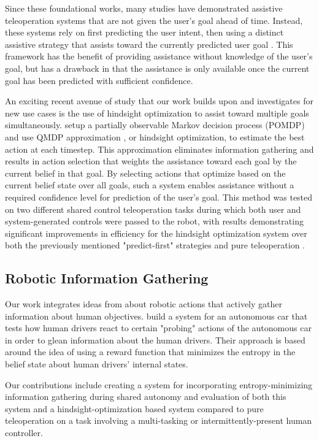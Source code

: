 \documentclass[conference]{IEEEtran}
\begin{document}
Since these foundational works, many studies have demonstrated assistive teleoperation systems that are not given the user's goal ahead of time. Instead, these systems rely on first predicting the user intent, then using a distinct assistive strategy that assists toward the currently predicted user goal \cite{dragan2012formalizing, fagg2004extracting, kragic2005human, schultz2017goal, yu2005telemanipulation}. This framework has the benefit of providing assistance without knowledge of the user's goal, but has a drawback in that the assistance is only available once the current goal has been predicted with sufficient confidence. 

An exciting recent avenue of study that our work builds upon and investigates for new use cases is the use of hindsight optimization to assist toward multiple goals simultaneously. \citet{javdani2015shared} setup a partially observable Markov decision process (POMDP) and use QMDP approximation \cite{littman1995learning}, or hindsight optimization, to estimate the best action at each timestep. This approximation eliminates information gathering and results in action selection that weights the assistance toward each goal by the current belief in that goal. By selecting actions that optimize based on the current belief state over all goals, such a system enables assistance without a required confidence level for prediction of the user's goal. This method was tested on two different shared control teleoperation tasks during which both user and system-generated controls were passed to the robot, with results demonstrating significant improvements in efficiency for the hindsight optimization system over both the previously mentioned "predict-first" strategies and pure teleoperation \cite{javdani2018shared}.

\subsection{Robotic Information Gathering}
Our work integrates ideas from \citet{sadigh2016information} about robotic actions that actively gather information about human objectives. \citet{sadigh2016information} build a system for an autonomous car that tests how human drivers react to certain "probing" actions of the autonomous car in order to glean information about the human drivers. Their approach is based around the idea of using a reward function that minimizes the entropy in the belief state about human drivers' internal states.

Our contributions include creating a system for incorporating entropy-minimizing information gathering during shared autonomy and evaluation of both this system and a hindsight-optimization based system compared to pure teleoperation on a task involving a multi-tasking or intermittently-present human controller.
\end{document}
